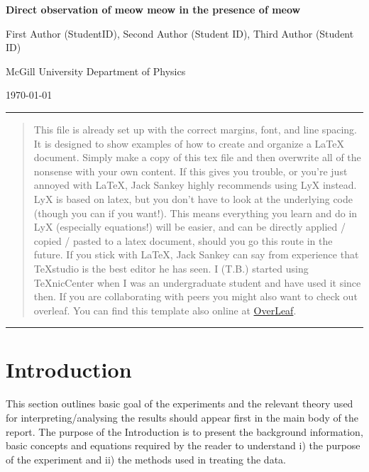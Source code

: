\documentclass[12pt]{article}
\begin{document}
\begin{titlepage}
\begin{center}
\begin{picture}
\end{picture}
		\vspace*{1.5cm}
		
		\Huge
		\textbf{Direct observation of meow meow in the presence of meow}
		\large
		\vspace{1.5cm}
		
		First Author (StudentID), Second Author (Student ID), Third Author (Student ID)
		
		McGill University Department of Physics
		
		\today
	\end{center}
		\hrule
	\begin{abstract} %
This file is already set up with the correct margins, font, and line spacing. It is designed to show examples of how to create and organize a LaTeX document. Simply make a copy of this tex file and then overwrite all of the nonsense with your own content. If this gives you trouble, or you're just annoyed with LaTeX, Jack Sankey highly recommends using LyX instead. LyX is based on latex, but you don't have to look at the underlying code (though you can if you want!). This means everything you learn and do in LyX (especially equations!) will be easier, and can be directly applied / copied / pasted to a latex document, should you go this route in the future. If you stick with LaTeX, Jack Sankey can say from experience that TeXstudio is the best editor he has seen. I (T.B.) started using TeXnicCenter when I was an undergraduate student and have used it since then. If you are collaborating with peers you might also want to check out overleaf. You can find this template also online at \href{https://www.overleaf.com/read/djxgtnvnwgkp}{OverLeaf}.
\end{abstract}
\hrule
\end{titlepage}
\setcounter{page}{1}

\section{Introduction}\label{sec:introduction}
This section outlines basic goal of the experiments and the relevant theory used for interpreting/analysing the results should appear first in the main body of the report. The purpose of the Introduction is to present the background information, basic concepts and equations required by the reader to understand i) the purpose of the experiment and ii) the methods used in treating the data. 
\end{document}
